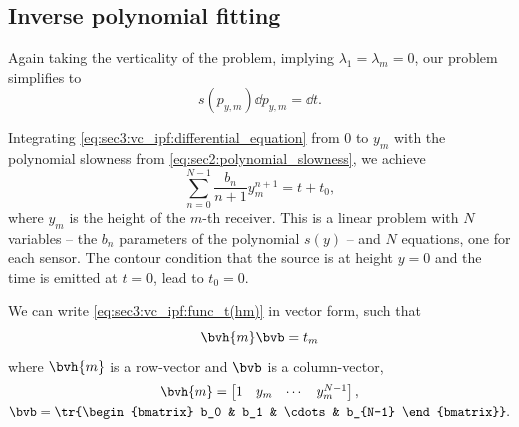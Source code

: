 \subsection{Inverse polynomial fitting}

Again taking the verticality of the problem, implying $\lambda_1 = \lambda_m = 0$, our problem simplifies to
\begin{equation}
	s(p_{y,m}) \dd p_{y,m} = \dd t.
	\label{eq:sec3:vc_ipf:differential_equation}
\end{equation}


Integrating \cref{eq:sec3:vc_ipf:differential_equation} from $0$ to $y_m$ with the polynomial slowness from \cref{eq:sec2:polynomial_slowness}, we achieve
\begin{equation}
	\sum_{n=0}^{N-1} \frac{b_n}{n+1}y_m^{n+1} = t + t_0,
	\label{eq:sec3:vc_ipf:func_t(hm)}
\end{equation}
where $y_m$ is the height of the $m$-th receiver. This is a linear problem with $N$ variables -- the $b_n$ parameters of the polynomial $s(y)$ -- and $N$ equations, one for each sensor. The contour condition that the source is at height $y=0$ and the time is emitted at $t=0$, lead to $t_0 = 0$.

We can write \cref{eq:sec3:vc_ipf:func_t(hm)} in vector form, such that
\begin{equation}
	\bvh{m} \bvb = t_m
\end{equation}
where $\bvh{m}$ is a row-vector and $\bvb$ is a column-vector,
\begin{subequations}
	\begin{gather}
		{\bvh{m}} = \begin{bmatrix}
				1 & y_m & \cdots & y_m^{N-1}
			\end{bmatrix}, \\
	{\bvb} = \tr{\begin{bmatrix}
			b_0 & b_1 & \cdots & b_{N-1}
		\end{bmatrix}}.
	\end{gather}
\end{subequations}

